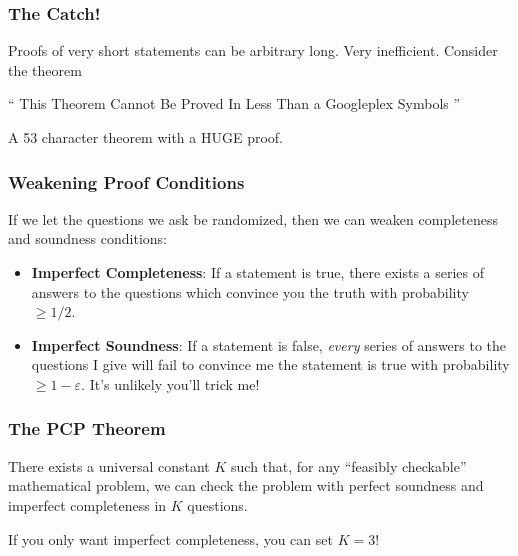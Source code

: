 \documentclass{beamer}
\begin{document}
\begin{frame}
    \frametitle{The Catch!}

    Proofs of very short statements can be arbitrary long. Very inefficient. Consider the theorem
    \begin{center}
        `` This Theorem Cannot Be Proved In Less Than a Googleplex Symbols ''
    \end{center}
    A 53 character theorem with a HUGE proof.
\end{frame}

\begin{frame}
    \frametitle{Weakening Proof Conditions}

    If we let the questions we ask be randomized, then we can weaken completeness and soundness conditions:
    \begin{itemize}
        \item<2-> {\bf Imperfect Completeness}: If a statement is true, there exists a series of answers to the questions which convince you the truth with probability $\geq 1/2$.

        \item<3-> {\bf Imperfect Soundness}: If a statement is false, {\it every} series of answers to the questions I give will fail to convince me the statement is true with probability $\geq 1 - \varepsilon$. It's unlikely you'll trick me!
    \end{itemize}
\end{frame}

\begin{frame}
    \frametitle{The PCP Theorem}

    \begin{theorem}
        There exists a universal constant $K$ such that, for any ``feasibly checkable'' mathematical problem, we can check the problem with perfect soundness and imperfect completeness in $K$ questions.
    \end{theorem}

    \begin{theorem}[1997, H\r{a}stad]
        If you only want imperfect completeness, you can set $K = 3$!
    \end{theorem}
\end{frame}
\end{document}

